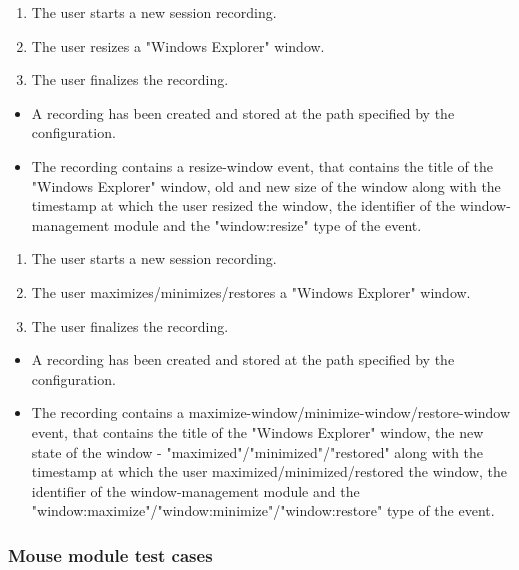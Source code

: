 \begin{tests}
	{\begin{enumerate}
		\item The \gls{user} starts a new \gls{session} recording.
		\item The \gls{user} resizes a "Windows Explorer" window.
		\item The \gls{user} finalizes the recording.
	\end{enumerate}}
	{\begin{itemize}
		\item A recording has been created and stored at the path specified by the configuration.
		\item The recording contains a resize-window \gls{event},  that contains the title of the "Windows Explorer" window, old and new size of the window along with the timestamp at which the \gls{user} resized the window, the identifier of the window-management module and the "window:resize" type of the event.
	\end{itemize}}
	
	{\begin{enumerate}
		\item The \gls{user} starts a new \gls{session} recording.
		\item The \gls{user} maximizes/minimizes/restores a "Windows Explorer" window.
		\item The \gls{user} finalizes the recording.
	\end{enumerate}}
	{\begin{itemize}
		\item A recording has been created and stored at the path specified by the configuration.
		\item The recording contains a maximize-window/minimize-window/restore-window \gls{event},  that contains the title of the "Windows Explorer" window, the new state of the window - "maximized"/"minimized"/"restored" along with the timestamp at which the \gls{user} maximized/minimized/restored the window, the identifier of the window-management module and the "window:maximize"/"window:minimize"/"window:restore" type of the event.
	\end{itemize}}
\end{tests}

\subsubsection{Mouse module test cases}

